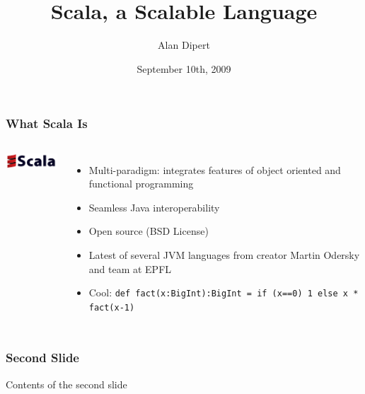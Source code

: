 \documentclass{beamer}
\title{Scala, a Scalable Language}
\author{Alan Dipert}
\date{September 10th, 2009}
\begin{document}
 
  \maketitle 

  \begin{frame} 
  \frametitle{What Scala Is}
  \begin{columns}[c]
    \column{0.5in}
      \includegraphics[width=1.0in]{graphics/scala_logo.png} 
    \column{2.5in}
      \begin{itemize}
        \item<1-> Multi-paradigm: integrates features of object oriented and functional programming
        \item<2-> Seamless Java interoperability
        \item<3-> Open source (BSD License)
        \item<4-> Latest of several JVM languages from creator Martin Odersky and team at EPFL
        \item<5-> Cool: \tt{def fact(x:BigInt):BigInt = if (x==0) 1 else x * fact(x-1)}
      \end{itemize}
  \end{columns}
  \end{frame} 

  \begin{frame} 
    \frametitle{Second Slide} 
    Contents of the second slide 
  \end{frame} 
\end{document}
